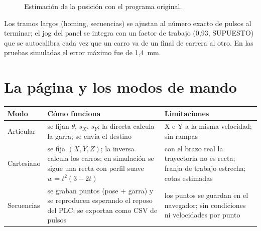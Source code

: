 \documentclass[a4paper,11pt]{article}
\begin{document}
\begin{figure}[H]
\centering
{}
\caption{Estimación de la posición con el programa original.}
\end{figure}
Los tramos largos (homing, secuencias) se ajustan al número exacto de pulsos al terminar; el jog del panel se integra con un factor de trabajo (0,93, SUPUESTO) que se autocalibra cada vez que un carro va de un final de carrera al otro. En las pruebas simuladas el error máximo fue de 1,4~mm.

\section{La página y los modos de mando}
\begin{center}\small
\begin{tabularx}{\linewidth}{>{\raggedright}p{2.4cm} >{\raggedright}X >{\raggedright\arraybackslash}X}
\toprule
\textbf{Modo} & \textbf{Cómo funciona} & \textbf{Limitaciones}\\
\midrule
Articular & se fijan $\theta$, $s_X$, $s_Y$; la directa calcula la garra; se envía el destino & X e Y a la misma velocidad; sin rampas\\
Cartesiano & se fija $(X,Y,Z)$; la inversa calcula los carros; en simulación se sigue una recta con perfil suave $w = t^2(3-2t)$ & con el brazo real la trayectoria no es recta; franja de trabajo estrecha; cotas estimadas\\
Secuencias & se graban puntos (pose + garra) y se reproducen esperando el reposo del PLC; se exportan como CSV de pulsos & los puntos se guardan en el navegador; sin condiciones ni velocidades por punto\\
\bottomrule
\end{tabularx}
\end{center}
\end{document}
